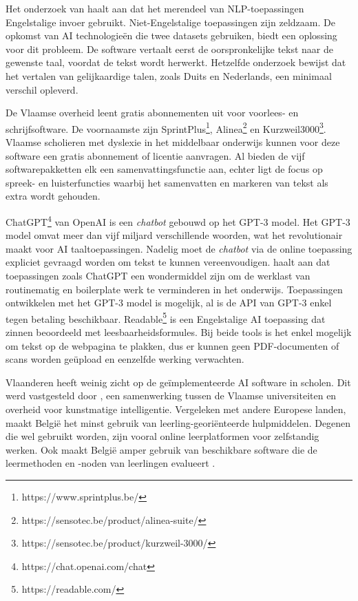 Het onderzoek van \textcite{Sciforce2020} haalt aan dat het merendeel van NLP-toepassingen Engelstalige invoer gebruikt. Niet-Engelstalige toepassingen zijn zeldzaam. De opkomst van AI technologieën die twee datasets gebruiken, biedt een oplossing voor dit probleem. De software vertaalt eerst de oorspronkelijke tekst naar de gewenste taal, voordat de tekst wordt herwerkt. Hetzelfde onderzoek bewijst dat het vertalen van gelijkaardige talen, zoals Duits en Nederlands, een minimaal verschil opleverd.

De Vlaamse overheid leent gratis abonnementen uit voor voorlees- en schrijfsoftware. De voornaamste zijn SprintPlus\footnote{https://www.sprintplus.be/}, Alinea\footnote{https://sensotec.be/product/alinea-suite/} en Kurzweil3000\footnote{https://sensotec.be/product/kurzweil-3000/}. Vlaamse scholieren met dyslexie in het middelbaar onderwijs kunnen voor deze software een gratis abonnement of licentie aanvragen. Al bieden de vijf softwarepakketten elk een samenvattingsfunctie aan, echter ligt de focus op spreek- en luisterfuncties waarbij het samenvatten en markeren van tekst als extra wordt gehouden.

ChatGPT\footnote{https://chat.openai.com/chat} van OpenAI is een \textit{chatbot} gebouwd op het GPT-3 model. Het GPT-3 model omvat meer dan vijf miljard verschillende woorden, wat het revolutionair maakt voor AI taaltoepassingen. Nadelig moet de \textit{chatbot} via de online toepassing expliciet gevraagd worden om tekst te kunnen vereenvoudigen. \textcite{Verhoeven2023} haalt aan dat toepassingen zoals ChatGPT een wondermiddel zijn om de werklast van routinematig en boilerplate werk te verminderen in het onderwijs. Toepassingen ontwikkelen met het GPT-3 model is mogelijk, al is de API van GPT-3 enkel tegen betaling beschikbaar. Readable\footnote{https://readable.com/} is een Engelstalige AI toepassing dat zinnen beoordeeld met leesbaarheidsformules. Bij beide tools is het enkel mogelijk om tekst op de webpagina te plakken, dus er kunnen geen PDF-documenten of scans worden geüpload en eenzelfde werking verwachten.

Vlaanderen heeft weinig zicht op de geïmplementeerde AI software in scholen. Dit werd vastgesteld door \autocite{Martens2021}, een samenwerking tussen de Vlaamse universiteiten en overheid voor kunstmatige intelligentie. Vergeleken met andere Europese landen, maakt België het minst gebruik van leerling-georiënteerde hulpmiddelen. Degenen die wel gebruikt worden, zijn vooral online leerplatformen voor zelfstandig werken. Ook maakt België amper gebruik van beschikbare software die de leermethoden en -noden van leerlingen evalueert \autocite{Martens2021a}. 

